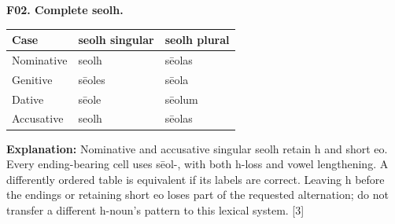 \par\begin{minipage}{\linewidth}\raggedright
\textbf{F02. Complete seolh.}

\par\begingroup
\fontsize{10.5}{13.2}\selectfont
\setlength{\LTleft}{0pt}\setlength{\LTright}{\fill}
\noindent
\begin{tabular}{@{}>{\raggedright\arraybackslash}p{38.56mm}>{\raggedright\arraybackslash}p{41.26mm}>{\raggedright\arraybackslash}p{38.56mm}@{}}
\toprule
\textbf{Case} & \textbf{seolh singular} & \textbf{seolh plural} \\
\midrule
Nominative & seolh & sēolas \\
Genitive & sēoles & sēola \\
Dative & sēole & sēolum \\
Accusative & seolh & sēolas \\
\bottomrule
\end{tabular}
\par\endgroup

\textbf{Explanation:} Nominative and accusative singular seolh retain h and short eo. Every ending-bearing cell uses sēol-, with both h-loss and vowel lengthening. A differently ordered table is equivalent if its labels are correct. Leaving h before the endings or retaining short eo loses part of the requested alternation; do not transfer a different h-noun's pattern to this lexical system. [3]

\end{minipage}\par\addvspace{4pt}

